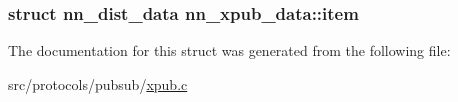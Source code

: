 \subsubsection[{item}]{\setlength{\rightskip}{0pt plus 5cm}struct {\bf nn\+\_\+dist\+\_\+data} nn\+\_\+xpub\+\_\+data\+::item}\hypertarget{structnn__xpub__data_ae205fa1e647458bb9db4198cce6fcbfd}{}\label{structnn__xpub__data_ae205fa1e647458bb9db4198cce6fcbfd}


The documentation for this struct was generated from the following file\+:\begin{DoxyCompactItemize}
\item 
src/protocols/pubsub/\hyperlink{xpub_8c}{xpub.\+c}\end{DoxyCompactItemize}

